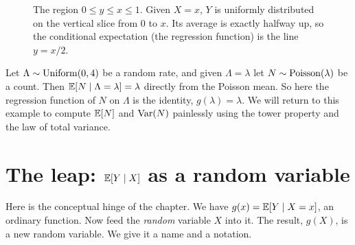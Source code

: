 \begin{figure}[H]
\centering
{}
\caption{The region $0 \le y \le x \le 1$. Given $X = x$, $Y$ is uniformly distributed on the vertical slice from $0$ to $x$. Its average is exactly halfway up, so the conditional expectation (the regression function) is the line $y = x/2$.}
\label{ch15:fig-triangle}
\end{figure}

\begin{example}
\label{ch15:ex-poisson-rate}
Let $\Lambda \sim \operatorname{Uniform}(0, 4)$ be a random rate, and given $\Lambda = \lambda$ let $N \sim \operatorname{Poisson}(\lambda)$
be a count. Then $\operatorname{\mathbb{E}}[N \mid \Lambda = \lambda] = \lambda$ directly from the Poisson mean. So here the
regression function of $N$ on $\Lambda$ is the identity, $g(\lambda) = \lambda$. We will return to this
example to compute $\operatorname{\mathbb{E}}[N]$ and $\operatorname{Var}(N)$ painlessly using the tower property and the law of total
variance.
\end{example}

\section{The leap: \texorpdfstring{$\operatorname{\mathbb{E}}[Y\mid X]$}{E[Y|X]} as a random variable}
\label{ch15:the-leap}

Here is the conceptual hinge of the chapter. We have $g(x) = \operatorname{\mathbb{E}}[Y\mid X = x]$, an ordinary function.
Now feed the \emph{random} variable $X$ into it. The result, $g(X)$, is a new random variable. We give
it a name and a notation.

